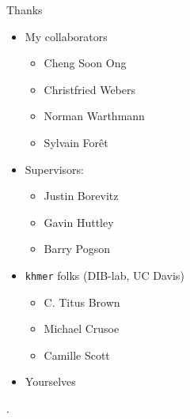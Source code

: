\documentclass[t]{beamer}
\begin{document}
\begin{frame}{Thanks}
  \begin{itemize}
    \item My collaborators
      \begin{itemize}
        \item Cheng Soon Ong
        \item Christfried Webers
        \item Norman Warthmann
        \item Sylvain For\^{e}t
      \end{itemize}
    \item Supervisors:
      \begin{itemize}
        \item Justin Borevitz
        \item Gavin Huttley
        \item Barry Pogson
      \end{itemize}
    \item \texttt{khmer} folks (DIB-lab, UC Davis)
      \begin{itemize}
        \item C. Titus Brown
        \item Michael Crusoe
        \item Camille Scott
      \end{itemize}
    \item Yourselves
  \end{itemize}
\end{frame}

\begin{frame}[shrink=20]{}
  \printbibliography
  \vfill
  .
\end{frame}
\end{document}
